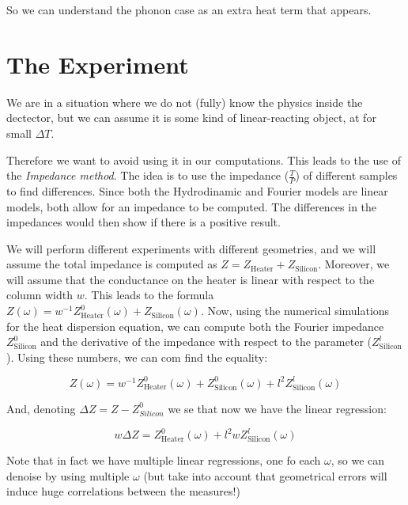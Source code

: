 \documentclass[a4paper, 11pt]{article}
\begin{document}
So we can understand the phonon case as an extra heat term that appears.




\section{The Experiment} %
\label{sec:the_experiment}

We are in a situation where we do not (fully) know the physics inside the dectector, but we can assume it is some kind of linear-reacting object, at for small $\Delta{T}$.

Therefore we want to avoid using it in our computations. This leads to the use of the \textit{Impedance method}. The idea is to use the impedance ($\frac{T}{P}$) of different samples to find differences. Since both the Hydrodinamic and Fourier models are linear models, both allow for an impedance to be computed. The differences in the impedances would then show if there is a positive result. 

We will perform different experiments with different geometries, and we will assume the total impedance is computed as $Z = Z_{\text{Heater}} + Z_{\text{Silicon}} $. Moreover, we will assume that the conductance on the heater is linear  with respect to the column width $w$. This leads to the formula $Z(\omega) = w^{-1}Z^0_{\text{Heater}}(\omega) + Z_{\text{Silicon}}(\omega)$. Now, using the numerical simulations for the heat dispersion equation, we can compute both the Fourier impedance $Z^0_{\text{Silicon}}$ and the derivative of the impedance with respect to the parameter ($Z^l_{\text{Silicon}}$). Using these numbers, we can com find the equality:

\begin{equation}
	Z(\omega) = w^{-1} Z^0_{\text{Heater}}(\omega) + Z^0_{\text{Silicon}}(\omega) + l^2 Z^l_{\text{Silicon}}(\omega)
\end{equation}


And, denoting $\Delta Z = Z-Z^0_{Silicon}$ we se that now we have the linear regression:

\begin{equation}
	w \Delta Z = Z^0_{\text{Heater}}(\omega)  +  l^2 w Z^l_{\text{Silicon}}(\omega) 
\end{equation}

Note that in fact we have multiple linear regressions, one fo each $\omega$, so we can denoise by using multiple $\omega$ (but take into account that geometrical errors will induce huge correlations between the measures!)

\end{document}
